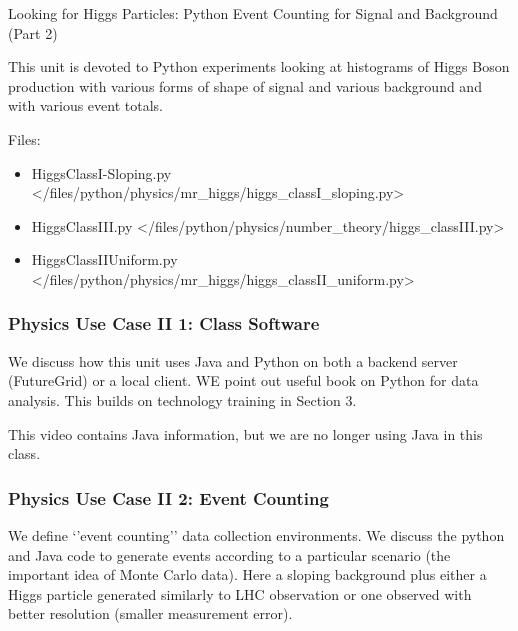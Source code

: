 Looking for Higgs Particles: Python Event Counting for Signal and
Background (Part 2)


This unit is devoted to Python experiments looking at histograms of
Higgs Boson production with various forms of shape of signal and various
background and with various event totals.


Files:

\begin{itemize}
\tightlist
\item
  HiggsClassI-Sloping.py \textless{}/files/python/physics/mr\_higgs/higgs\_classI\_sloping.py\textgreater{}
\item
  HiggsClassIII.py \textless{}/files/python/physics/number\_theory/higgs\_classIII.py\textgreater{}
\item
  HiggsClassIIUniform.py \textless{}/files/python/physics/mr\_higgs/higgs\_classII\_uniform.py\textgreater{}
\end{itemize}

\subsubsection{Physics Use Case II 1: Class
Software}\label{physics-use-case-ii-1-class-software}

We discuss how this unit uses Java and Python on both a backend server
(FutureGrid) or a local client. WE point out useful book on Python for
data analysis. This builds on technology training in Section 3.


This video contains Java information, but we are no longer using Java in
this class.

\subsubsection{Physics Use Case II 2: Event
Counting}\label{physics-use-case-ii-2-event-counting}

We define `'event counting'' data collection environments. We discuss
the python and Java code to generate events according to a particular
scenario (the important idea of Monte Carlo data). Here a sloping
background plus either a Higgs particle generated similarly to LHC
observation or one observed with better resolution (smaller measurement
error).

